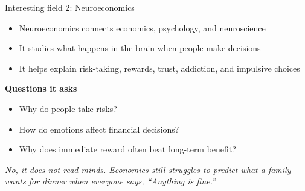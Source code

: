 \documentclass[aspectratio=169,11pt]{beamer}
\begin{document}
\begin{frame}{Interesting field 2: Neuroeconomics}
\begin{itemize}
    \item Neuroeconomics connects economics, psychology, and neuroscience
    \item It studies what happens in the brain when people make decisions
    \item It helps explain risk-taking, rewards, trust, addiction, and impulsive choices
\end{itemize}
\vspace{0.4cm}
\textbf{Questions it asks}
\begin{itemize}
    \item Why do people take risks?
    \item How do emotions affect financial decisions?
    \item Why does immediate reward often beat long-term benefit?
\end{itemize}
\vspace{0.3cm}
\textit{No, it does not read minds. Economics still struggles to predict what a family wants for dinner when everyone says, ``Anything is fine.''}
\end{frame}
\end{document}
